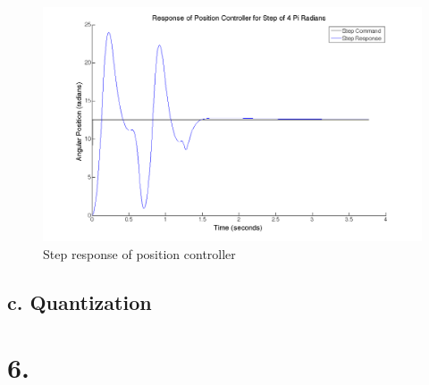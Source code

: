 \documentclass{article}
\theoremstyle{plain}
\theoremstyle{definition}
\theoremstyle{remark}
\begin{document}
\begin{figure}
\begin{center}
\includegraphics[width = 14cm]{posstep_4pi.png}
\caption{Step response of position controller}
\label{q5_b5}
\end{center}
\end{figure}

\subsection*{c. Quantization}

\section*{6.}
\end{document}
